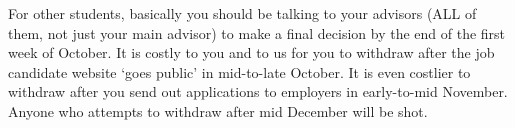 \documentclass{econtex}
\begin{document}
\begin{enumerate}
For other students, basically you should be talking to your advisors
(ALL of them, not just your main advisor) to make a final decision by
the end of the first week of October.  It is costly to you and to us
for you to withdraw after the job candidate website `goes public' in
mid-to-late October.  It is even costlier to withdraw after you send
out applications to employers in early-to-mid November.  Anyone who
attempts to withdraw after mid December will be shot.

\begin{comment}

  In the dept meeting on 2006-10-17 a question was raised about
  whether we are really serious about our policy, as stated by Larry,
  that ``there is no such thing as a 7th year student.''  

  The answer is yes.

  There was then some discussion about the relationship between going
  on the job market and remaining in the program, caused by the fact
  that there are currently three students (Tereanu, Svitil, Lu) who
  are clearly not ready for the job market but have not given up all
  hope of finishing a dissertation by August of next year.

  The resolution (subsequently clarified in emails on 2006-10-18 and
  2006-10-19 and an email to Zhou Lu on 2006-10-19 from CDC) was as
  follows.

  Our declared public policy (see the graduate \href{handbook}{http://www.econ2.jhu.edu/pdf/Econ_Grad_Handbook.pdf}) is that nobody can enroll for a 7th year
  in the program.  In practice, if in the opinion of an advisor and
  second advisor, a student's dissertation is essentially complete as
  of August of the 6th year, we may relax this rigor slightly in order
  to arrange a defense and final ``cleaning up'' of details - but {\it
    only} in the case where the dissertation is in all essentials
  complete.

  So, an important real and psychological point here is that failure
  to be included in the official list of candidates is almost (but not
  quite) equivalent to the end of all hope of obtaining a JHU PhD.  If
  a student uses wisely the time freed up by not participating in the
  job market to conduct an intense burst of high quality research, it
  is in principle quite possible that they will finish a dissertation
  despite their prior lack of progress.  The exclusion from the job
  market process may concentrate their minds in a way that has not
  happened before.


\end{comment}
\end{enumerate}
\end{document}
